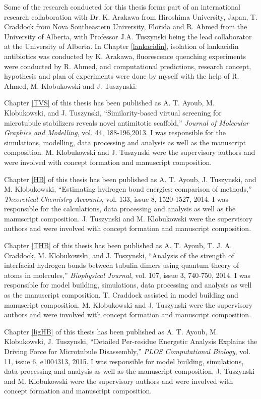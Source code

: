 \documentclass[11pt]{report}
\begin{document}
\onehalfspacing	%

\begin{preface}

Some of the research conducted for this thesis  forms part of an 
international research collaboration with Dr. K. Arakawa
from Hiroshima University, Japan, T. Craddock from 
Nova Southeastern University, Florida
and R. Ahmed from
the University of Alberta, with Professor J.A.
Tuszynski being the lead collaborator at the University of Alberta.
In Chapter \ref{lankacidin}, isolation of lankacidin antibiotics was conducted by K. Arakawa,
fluorescence quenching experiments were conducted by
R. Ahmed, and computational predictions, research concept, hypothesis and
plan of experiments were done by myself with the help of
R. Ahmed, M. Klobukowski and J. Tuszynski.


Chapter \ref{TVS} of this thesis has been published as
A. T. Ayoub, M. Klobukowski, and J. Tuszynski, ``Similarity-based virtual screening for microtubule stabilizers reveals novel antimitotic scaffold,'' \emph{Journal of Molecular Graphics
and Modelling}, vol. 44, 188-196,2013. I was responsible for the 
simulations, modelling, data processing and analysis as well as the
manuscript composition. M. Klobukowski and J. Tuszynski were the supervisory authors and were involved with concept
formation and manuscript composition.


Chapter \ref{HB} of this thesis has been published as
A. T. Ayoub, J. Tuszynski, and M. Klobukowski, ``Estimating hydrogen bond energies: comparison of methods,''
\emph{Theoretical Chemistry Accounts}, vol. 133, issue 8,
1520-1527, 2014. I was responsible for the 
calculations, data processing and analysis as well as the
manuscript composition. J. Tuszynski and M. Klobukowski were the supervisory authors and were involved with concept
formation and manuscript composition.

Chapter \ref{THB} of this thesis has been published as
A. T. Ayoub, T. J. A. Craddock, M. Klobukowski, and J. Tuszynski,
``Analysis of the strength of interfacial hydrogen bonds between tubulin dimers using quantum theory of atoms in molecules,''
\emph{Biophysical Journal}, vol. 107, issue 3, 740-750, 2014.
I was responsible for
model building, simulations, data processing and analysis as well as the
manuscript composition. T. Craddock assisted in model building and manuscript composition. M. Klobukowski and  J. Tuszynski were the supervisory authors and were involved with concept
formation and manuscript composition.

Chapter \ref{ligHB} of this thesis has been published as A. T. Ayoub, M. Klobukowski, J. Tuszynski,
``Detailed Per-residue Energetic Analysis Explains the Driving Force for Microtubule Disassembly,'' \emph{PLOS Computational Biology}, vol. 11, issue 6, e1004313, 2015.
I was responsible for model building, 
simulations, data processing and analysis as well as the
manuscript composition. J. Tuszynski and M. Klobukowski were the supervisory authors and were involved with concept
formation and manuscript composition.

\end{preface}
\end{document}

